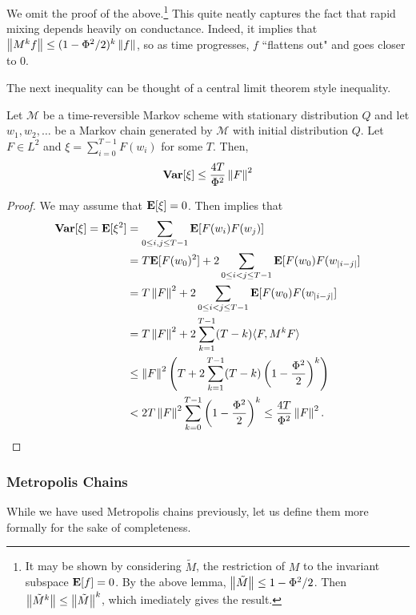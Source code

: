 We omit the proof of the above.\footnote{It may be shown by considering $\tilde{M}$, the restriction of $M$ to the invariant subspace $\textbf{E}[f]=0$. By the above lemma, $\left\lVert\tilde{M}\right\rVert\leq 1-\Phi^2/2$. Then $\left\lVert\tilde{M}^k\right\rVert \leq \left\lVert\tilde{M}\right\rVert^k$, which imediately gives the result.} This quite neatly captures the fact that rapid mixing depends heavily on conductance. Indeed, it implies that $\left\lVert M^k f\right\rVert \leq (1-\Phi^2/2)^k \left\lVert f\right\rVert$, so as time progresses, $f$ ``flattens out" and goes closer to $0$.

The next inequality can be thought of a central limit theorem style inequality.

\begin{theorem}
    Let $\mathcal{M}$ be a time-reversible Markov scheme with stationary distribution $Q$ and let $w_1,w_2,\ldots$ be a Markov chain generated by $\mathcal{M}$ with initial distribution $Q$. Let $F\in L^2$ and $\xi = \sum_{i=0}^{T-1}F(w_i)$ for some $T$. Then,
    \[ \operatorname{\textbf{Var}}[\xi] \leq \frac{4T}{\Phi^2}\left\lVert F\right\rVert^2 \]
\end{theorem}
\begin{proof}
    We may assume that $\textbf{E}[\xi] = 0$. Then  implies that
    \begin{align*}
        \operatorname{\textbf{Var}}[\xi] = \textbf{E}[\xi^2] &= \sum_{0\leq i,j\leq T-1} \textbf{E}[F(w_i)F(w_j)] \\
            &= T\textbf{E}[F(w_0)^2] + 2 \sum_{0\leq i<j\leq T-1} \textbf{E}[F(w_0)F(w_{|i-j|}] \\
            &= T\left\lVert F\right\rVert^2 + 2 \sum_{0\leq i<j\leq T-1} \textbf{E}[F(w_0)F(w_{|i-j|}] \\
            &= T\left\lVert F\right\rVert^2 + 2 \sum_{k=1}^{T-1} (T-k) \langle F,M^{k}F\rangle \\
            &\leq \left\lVert F\right\rVert^2 \left(T + 2 \sum_{k=1}^{T-1} (T-k)\left(1-\frac{\Phi^2}{2}\right)^k\right) \\
            &< 2T\left\lVert F\right\rVert^2 \sum_{k=0}^{T-1} \left(1-\frac{\Phi^2}{2}\right)^k \leq \frac{4T}{\Phi^2} \left\lVert F\right\rVert^2.
    \end{align*}
\end{proof}

\subsubsection{Metropolis Chains}

While we have used Metropolis chains previously, let us define them more formally for the sake of completeness.

